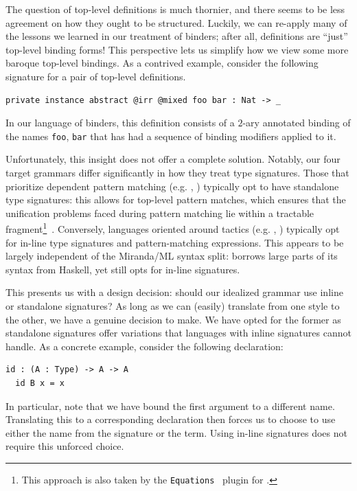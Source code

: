 \documentclass[a4paper,UKenglish,cleveref, autoref, thm-restate,anonymous]{lipics-v2021}
\begin{document}
The question of top-level definitions is much thornier, and there seems to be less agreement on how
they ought to be structured. Luckily, we can re-apply many of the lessons we learned in our treatment of binders;
after all, definitions are ``just'' top-level binding forms! This perspective lets us simplify how
we view some more baroque top-level bindings. As a contrived example, consider the following signature
for a pair of top-level \agda definitions.
\begin{lstlisting}[style=agda,caption={A complicated \agda signature.}]
private instance abstract @irr @mixed foo bar : Nat -> _
\end{lstlisting}
In our language of binders, this definition consists of a \(2\)-ary annotated binding
of the names \lstinline|foo|, \lstinline|bar| that has had a sequence of binding modifiers applied to it.

Unfortunately, this insight does not offer a complete solution. Notably, our
four target grammars differ significantly in how they treat type signatures.
Those that prioritize dependent pattern matching (e.g. \agda, \idris) typically
opt to have standalone type signatures: this allows for top-level pattern
matches, which ensures that the unification problems faced during pattern matching lie
within a tractable fragment\footnote{This approach is also taken by the \texttt{Equations}~\cite{Sozeau:2010} plugin for \rocq.}~\cite{Coquand:1992}.
Conversely, languages oriented around tactics (e.g. \lean, \rocq) typically opt for in-line type signatures and
pattern-matching expressions. This appears to be largely independent of
the Miranda/ML syntax split: \lean borrows large parts of its syntax from Haskell,
yet still opts for in-line signatures.

This presents us with a design decision: should our idealized grammar use inline or standalone signatures?
As long as we can (easily) translate from one style to the other, we have a genuine decision to make.
We have opted for the former as standalone signatures offer variations that languages with inline
signatures cannot handle. As a concrete example, consider the following \agda declaration:

\begin{lstlisting}[style=agda,caption={A definition with mismatched names.}]
  id : (A : Type) -> A -> A
  id B x = x
\end{lstlisting}

In particular, note that we have bound the first argument to a different name. Translating this to a
corresponding \rocq declaration then forces us to choose to use either the name from the signature
or the term. Using in-line signatures does not require this unforced choice.
\end{document}
